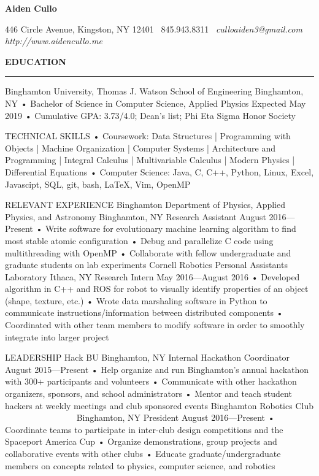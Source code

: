 \documentclass{article}
\begin{document}
\newcommand{\ts}{\textsuperscript}

\centerline{\huge \textbf{Aiden Cullo}}\newline
\centerline{\small 446 Circle Avenue, Kingston, NY 12401 \textbar \, 845.943.8311 \textbar \,  \textit{culloaiden3@gmail.com} \textbar \,  \textit{http://www.aidencullo.me}}\newline

\textbf{EDUCATION}
\vspace{10mm}
\rule{\linewidth}{0.4pt}
Binghamton University, Thomas J. Watson School of Engineering 	                                                     Binghamton, NY
•	Bachelor of Science in Computer Science, Applied Physics                                                                                       Expected May 2019
•	Cumulative GPA: 3.73/4.0; Dean’s list; Phi Eta Sigma Honor Society

TECHNICAL SKILLS
•	Coursework: Data Structures | Programming with Objects | Machine Organization | Computer Systems | Architecture and Programming | Integral Calculus | Multivariable Calculus | Modern Physics | Differential Equations
•	Computer Science: Java, C, C++, Python, Linux, Excel, Javascipt, SQL, git, bash, LaTeX, Vim, OpenMP

RELEVANT EXPERIENCE
Binghamton Department of Physics, Applied Physics, and Astronomy	       	                                       Binghamton, NY
Research Assistant			   				                                                                   August 2016—Present
•	Write software for evolutionary machine learning algorithm to find most stable atomic configuration
•	Debug and parallelize C code using multithreading with OpenMP
•	Collaborate with fellow undergraduate and graduate students on lab experiments
Cornell Robotics Personal Assistants Laboratory				          		                                    Ithaca, NY
Research Intern			     	              						                  May 2016—August 2016
•	Developed algorithm in C++ and ROS for robot to visually identify properties of an object (shape, texture, etc.)
•	Wrote data marshaling software in Python to communicate instructions/information between distributed components
•	Coordinated with other team members to modify software in order to smoothly integrate into larger project

LEADERSHIP
Hack BU	        								            		            Binghamton, NY
Internal Hackathon Coordinator							                                      August 2015—Present
•	Help organize and run Binghamton’s annual hackathon with 300+ participants and volunteers
•	Communicate with other hackathon organizers, sponsors, and school administrators
•	Mentor and teach student hackers at weekly meetings and club sponsored events
Binghamton Robotics Club						                 		             Binghamton, NY
President									              	                                      August 2016—Present
•	Coordinate teams to participate in inter-club design competitions and the Spaceport America Cup
•	Organize demonstrations, group projects and collaborative events with other clubs
•	Educate graduate/undergraduate members on concepts related to physics, computer science, and robotics
\end{document}
